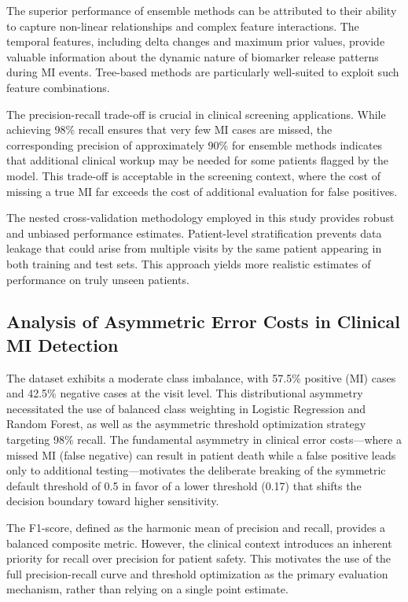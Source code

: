 \documentclass[fleqn,10pt,lineno]{wlpeerj}
\begin{document}
The superior performance of ensemble methods can be attributed to their ability to capture non-linear relationships and complex feature interactions. The temporal features, including delta changes and maximum prior values, provide valuable information about the dynamic nature of biomarker release patterns during MI events. Tree-based methods are particularly well-suited to exploit such feature combinations.

The precision-recall trade-off is crucial in clinical screening applications. While achieving 98\% recall ensures that very few MI cases are missed, the corresponding precision of approximately 90\% for ensemble methods indicates that additional clinical workup may be needed for some patients flagged by the model. This trade-off is acceptable in the screening context, where the cost of missing a true MI far exceeds the cost of additional evaluation for false positives.

The nested cross-validation methodology employed in this study provides robust and unbiased performance estimates. Patient-level stratification prevents data leakage that could arise from multiple visits by the same patient appearing in both training and test sets. This approach yields more realistic estimates of performance on truly unseen patients.

\subsection*{Analysis of Asymmetric Error Costs in Clinical MI Detection}

The dataset exhibits a moderate class imbalance, with 57.5\% positive (MI) cases and 42.5\% negative cases at the visit level. This distributional asymmetry necessitated the use of balanced class weighting in Logistic Regression and Random Forest, as well as the asymmetric threshold optimization strategy targeting 98\% recall. The fundamental asymmetry in clinical error costs---where a missed MI (false negative) can result in patient death while a false positive leads only to additional testing---motivates the deliberate breaking of the symmetric default threshold of 0.5 in favor of a lower threshold (0.17) that shifts the decision boundary toward higher sensitivity.

The F1-score, defined as the harmonic mean of precision and recall, provides a balanced composite metric. However, the clinical context introduces an inherent priority for recall over precision for patient safety. This motivates the use of the full precision-recall curve and threshold optimization as the primary evaluation mechanism, rather than relying on a single point estimate.
\end{document}
